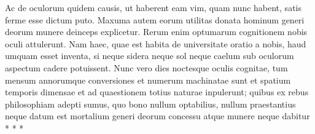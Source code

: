  Ac de oculorum quidem causis, ut haberent eam vim, quam nunc habent, satis ferme esse dictum puto. Maxuma autem eorum utilitas donata hominum generi deorum munere deinceps explicetur. Rerum enim optumarum cognitionem nobis oculi attulerunt. Nam haec, quae est habita de universitate oratio a nobis, haud umquam esset inventa, si neque sidera neque sol neque caelum sub oculorum aspectum cadere potuissent. Nunc vero dies noctesque oculis cognitae, tum mensum annorumque conversiones et numerum machinatae sunt et spatium temporis dimensae et ad quaestionem totius naturae inpulerunt; quibus ex rebus philosophiam adepti sumus, quo bono nullum optabilius, nullum praestantius neque datum est mortalium generi deorum concessu atque munere neque dabitur * * *
